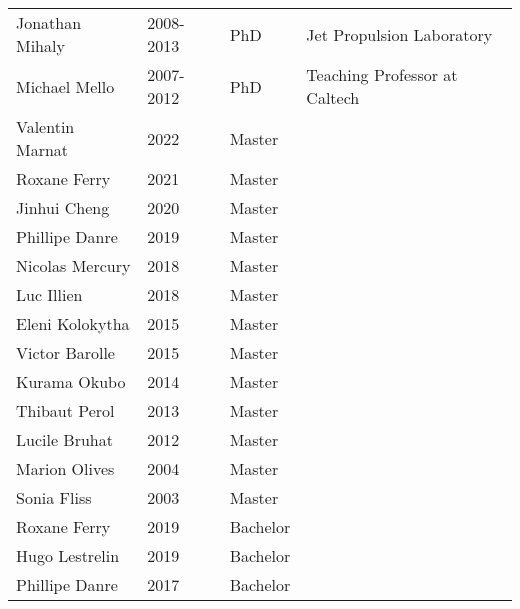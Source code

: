 \begin{table}[h!]
\begin{tabular}{L{4cm}L{3cm}L{2cm}D{6cm}}
\color{gray}Jonathan Mihaly       & 2008-2013         &  PhD        &  Jet Propulsion Laboratory\\
\color{gray}Michael Mello         & 2007-2012         &  PhD        &  Teaching Professor at Caltech\\[12pt]
\hline
\color{gray}Valentin Marnat	  	  & 2022              &  Master     &  \\
\color{gray}Roxane Ferry    	  	  & 2021              &  Master     &  \\
\color{gray}Jinhui Cheng    	      & 2020              &  Master     &  \\
\color{gray}Phillipe Danre    	  & 2019              &  Master     &  \\
\color{gray}Nicolas Mercury    	  & 2018              &  Master     &  \\
\color{gray}Luc Illien      	      & 2018              &  Master     &  \\
\color{gray}Eleni Kolokytha    	  & 2015              &  Master     &  \\
\color{gray}Victor Barolle    	  & 2015              &  Master     &  \\
\color{gray}Kurama Okubo      	  & 2014              &  Master     &  \\
\color{gray}Thibaut Perol      	  & 2013              &  Master     &  \\
\color{gray}Lucile Bruhat      	  & 2012              &  Master     &  \\
\color{gray}Marion Olives      	  & 2004              &  Master     &  \\
\color{gray}Sonia Fliss      	  & 2003              &  Master     &  \\[12pt]
\hline
\color{gray}Roxane Ferry    	      & 2019              &  Bachelor   &  \\
\color{gray}Hugo Lestrelin    	  & 2019              &  Bachelor   &  \\
\color{gray}Phillipe Danre    	  & 2017              &  Bachelor   &  \\[12pt]
\hline
\end{tabular}
\end{table}\\
